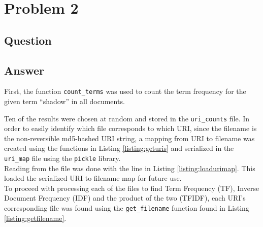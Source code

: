 \section{Problem 2}

\subsection{Question}



\subsection{Answer}
\vspace{2mm}
First, the function {\tt count\_terms} was used to count\cite{wordcount} the term frequency for the given term ``shadow'' in all documents.

\newpage
\vspace{5mm}


Ten of the results were chosen at random and stored in the {\tt uri\_counts} file. In order to easily identify which file corresponds to which URI, since the filename is the non-reversible md5-hashed URI string, a mapping from URI to filename was created using the functions in Listing \ref{listing:geturis} and serialized in the {\tt uri\_map} file using the {\tt pickle}\cite{pickle} library.\\



Reading from the file was done with the line in Listing \ref{listing:loadurimap}. This loaded the serialized URI to filename map for future use.\\



To proceed with processing each of the files to find Term Frequency (TF), Inverse Document Frequency (IDF) and the product of the two (TFIDF), each URI's corresponding file was found using the {\tt get\_filename} function found in Listing \ref{listing:getfilename}.\\



